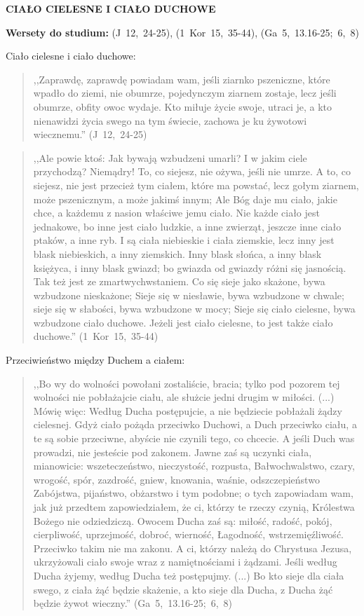 \documentclass[10pt,a4paper,oneside]{article}
\begin{document}
\centerline{\textbf{\MakeUppercase{Ciało cielesne i ciało duchowe}}}
\begin{center}
\textbf{Wersety do studium:} (J~12,~24-25), (1~Kor~15,~35-44), (Ga~5,~13.16-25;~6,~8)
\end{center}
Ciało cielesne i ciało duchowe:
\begin{quote}
,,Zaprawdę, zaprawdę powiadam wam, jeśli ziarnko pszeniczne, które wpadło do ziemi, nie obumrze, pojedynczym ziarnem zostaje, lecz jeśli obumrze, obfity owoc wydaje. Kto miłuje życie swoje, utraci je, a kto nienawidzi życia swego na tym świecie, zachowa je ku żywotowi wiecznemu.'' (J~12,~24-25)
\end{quote}
\begin{quote}
,,Ale powie ktoś: Jak bywają wzbudzeni umarli? I w jakim ciele przychodzą? Niemądry! To, co siejesz, nie ożywa, jeśli nie umrze. A to, co siejesz, nie jest przecież tym ciałem, które ma powstać, lecz gołym ziarnem, może pszenicznym, a może jakimś innym; Ale Bóg daje mu ciało, jakie chce, a każdemu z nasion właściwe jemu ciało. Nie każde ciało jest jednakowe, bo inne jest ciało ludzkie, a inne zwierząt, jeszcze inne ciało ptaków, a inne ryb. I są ciała niebieskie i ciała ziemskie, lecz inny jest blask niebieskich, a inny ziemskich. Inny blask słońca, a inny blask księżyca, i inny blask gwiazd; bo gwiazda od gwiazdy różni się jasnością. Tak też jest ze zmartwychwstaniem. Co się sieje jako skażone, bywa wzbudzone nieskażone; Sieje się w niesławie, bywa wzbudzone w chwale; sieje się w słabości, bywa wzbudzone w mocy; Sieje się ciało cielesne, bywa wzbudzone ciało duchowe. Jeżeli jest ciało cielesne, to jest także ciało duchowe.'' (1~Kor~15,~35-44)
\end{quote}

Przeciwieństwo między Duchem a ciałem:
\begin{quote}
,,Bo wy do wolności powołani zostaliście, bracia; tylko pod pozorem tej wolności nie pobłażajcie ciału, ale służcie jedni drugim w miłości. (...) Mówię więc: Według Ducha postępujcie, a nie będziecie pobłażali żądzy cielesnej. Gdyż ciało pożąda przeciwko Duchowi, a Duch przeciwko ciału, a te są sobie przeciwne, abyście nie czynili tego, co chcecie. A jeśli Duch was prowadzi, nie jesteście pod zakonem. Jawne zaś są uczynki ciała, mianowicie: wszeteczeństwo, nieczystość, rozpusta, Bałwochwalstwo, czary, wrogość, spór, zazdrość, gniew, knowania, waśnie, odszczepieństwo Zabójstwa, pijaństwo, obżarstwo i tym podobne; o tych zapowiadam wam, jak już przedtem zapowiedziałem, że ci, którzy te rzeczy czynią, Królestwa Bożego nie odziedziczą. Owocem Ducha zaś są: miłość, radość, pokój, cierpliwość, uprzejmość, dobroć, wierność, Łagodność, wstrzemięźliwość. Przeciwko takim nie ma zakonu. A ci, którzy należą do Chrystusa Jezusa, ukrzyżowali ciało swoje wraz z namiętnościami i żądzami. Jeśli według Ducha żyjemy, według Ducha też postępujmy. (...) Bo kto sieje dla ciała swego, z ciała żąć będzie skażenie, a kto sieje dla Ducha, z Ducha żąć będzie żywot wieczny.'' (Ga~5,~13.16-25;~6,~8)
\end{quote}
\end{document}

